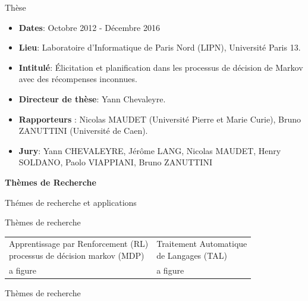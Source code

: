 \documentclass{beamer}
\begin{document}
{\begin{frame}{Thèse}
\begin{itemize} 
\item \textbf{Dates}: Octobre 2012 - Décembre 2016
\item \textbf{Lieu}: Laboratoire d’Informatique de Paris Nord (LIPN),
Université Paris 13.
\item \textbf{Intitulé}: Élicitation et planification dans les processus de
décision de Markov avec des récompenses inconnues.
\item \textbf{Directeur de thèse}: Yann Chevaleyre.
\item \textbf{Rapporteurs} : Nicolas MAUDET (Université Pierre et
Marie Curie), Bruno ZANUTTINI (Université de Caen).
\item \textbf{Jury}: Yann CHEVALEYRE, Jérôme LANG, Nicolas
MAUDET, Henry SOLDANO, Paolo VIAPPIANI, Bruno
ZANUTTINI
\end{itemize}
	
\end{frame}

\begin{frame}
	\begin{center}
	\textbf{Thèmes de Recherche}
	\end{center}
\end{frame}
{


\begin{frame}{Thémes de recherche et applications}

\end{frame}

\begin{frame}{Thèmes de recherche}

\begin{center}

\begin{tabular}{ll}
   \makecell{Apprentissage par Renforcement (RL) \\ \small{processus de décision markov (MDP)}} & \makecell{Traitement Automatique \\ de Langages (TAL)} \\
   a figure & a figure\\
\end{tabular}
\end{center}

\end{frame}
\begin{frame}{Thèmes de recherche}


\end{frame}}}
\end{document}
